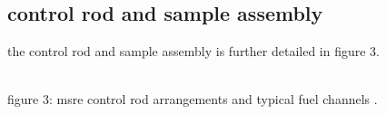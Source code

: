 \documentclass{article}
\begin{document}
\begin{preview}
\subsection{control rod and sample assembly}
the control rod and sample assembly is further detailed in figure 3.
\begin{center}
  \\
  figure 3: msre control rod arrangements and typical fuel channels \parencite[figure 2]{ornl-tm-0378}.
\end{center}



\end{preview}
\end{document}
